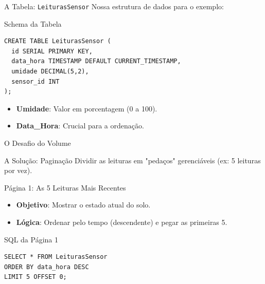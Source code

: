 \documentclass[9pt]{beamer}
\begin{document}
\begin{frame}[fragile]{A Tabela: \texttt{LeiturasSensor}}
  \small
  Nossa estrutura de dados para o exemplo:
  \vspace{0.3cm}
  \begin{exampleblock}{Schema da Tabela}
\begin{lstlisting}
CREATE TABLE LeiturasSensor (
  id SERIAL PRIMARY KEY,
  data_hora TIMESTAMP DEFAULT CURRENT_TIMESTAMP,
  umidade DECIMAL(5,2),
  sensor_id INT
);
\end{lstlisting}
  \end{exampleblock}
  \vspace{0.3cm}
  \begin{itemize}
    \item \textbf{Umidade}: Valor em porcentagem (0 a 100).
    \item \textbf{Data\_Hora}: Crucial para a ordenação.
  \end{itemize}
\end{frame}

\begin{frame}{O Desafio do Volume}
  \centering
  \vspace{0.4cm}
  \begin{block}{A Solução: Paginação}
    Dividir as leituras em "pedaços" gerenciáveis (ex: 5 leituras por vez).
  \end{block}
\end{frame}

\begin{frame}[fragile]{Página 1: As 5 Leituras Mais Recentes}
  \begin{itemize}
    \item \textbf{Objetivo}: Mostrar o estado atual do solo.
    \item \textbf{Lógica}: Ordenar pelo tempo (descendente) e pegar as primeiras 5.
  \end{itemize}
  \vspace{0.4cm}
  \begin{exampleblock}{SQL da Página 1}
\begin{lstlisting}
SELECT * FROM LeiturasSensor
ORDER BY data_hora DESC
LIMIT 5 OFFSET 0;
\end{lstlisting}
  \end{exampleblock}
\end{frame}
\end{document}
